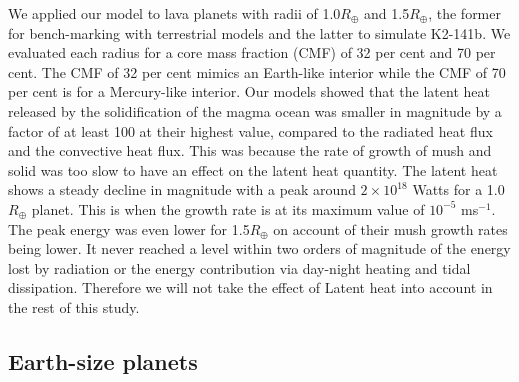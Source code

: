 \documentclass[fleqn,usenatbib]{mnras}
\begin{document}
We applied our model to lava planets with radii of 1.0$R_{\oplus}$ and 1.5$R_{\oplus}$, the former for bench-marking with terrestrial models and the latter to simulate K2-141b. We evaluated each radius for a core mass fraction (CMF) of 32 per cent and 70 per cent. The CMF of 32 per cent mimics an Earth-like interior while the CMF of 70 per cent is for a Mercury-like interior. Our models showed that the latent heat released by the solidification of the magma ocean was smaller in magnitude by a factor of at least 100 at their highest value, compared to the radiated heat flux and the convective heat flux. This was because the rate of growth of mush and solid was too slow to have an effect on the latent heat quantity. The latent heat shows a steady decline in magnitude with a peak around $2 \times 10^{18}$ Watts for a 1.0$R_{\oplus}$ planet. This is when the growth rate is at its maximum value of $10^{-5}$ ms$^{-1}$. The peak energy was even lower for 1.5$R_{\oplus}$ on account of their mush growth rates being lower. It never reached a level within two orders of magnitude of the energy lost by radiation or the energy contribution via day-night heating and tidal dissipation. Therefore we will not take the effect of Latent heat into account in the rest of this study.     

\subsection{Earth-size planets}    \label{sec3.1}
\end{document}
